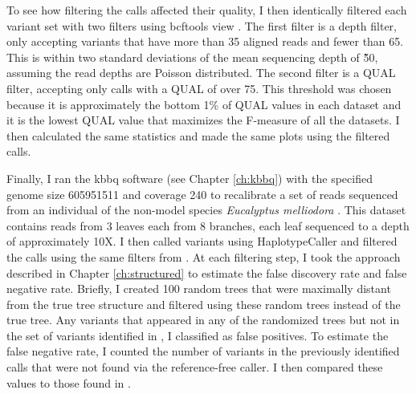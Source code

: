 To see how filtering the calls affected their quality, I then identically filtered each variant set with two filters using bcftools view \parencite{li_sequence_2009}. The first filter is a depth filter, only accepting variants that have more than 35 aligned reads and fewer than 65. This is within two standard deviations of the mean sequencing depth of \~50, assuming the read depths are Poisson distributed. The second filter is a QUAL filter, accepting only calls with a QUAL of over 75. This threshold was chosen because it is approximately the bottom 1\% of QUAL values in each dataset and it is the lowest QUAL value that maximizes the F-measure of all the datasets. I then calculated the same statistics and made the same plots using the filtered calls.


Finally, I ran the kbbq software (see Chapter \ref{ch:kbbq}) with the specified genome size 605951511 and coverage 240 to recalibrate a set of reads sequenced from an individual of the non-model species \textit{Eucalyptus melliodora} \parencite{orr_phylogenomic_2020}. This dataset contains reads from 3 leaves each from 8 branches, each leaf sequenced to a depth of approximately 10X. I then called variants using HaplotypeCaller and filtered the calls using the same filters from \cite{orr_phylogenomic_2020}. At each filtering step, I took the approach described in Chapter \ref{ch:structured} to estimate the false discovery rate and false negative rate. Briefly, I created 100 random trees that were maximally distant from the true tree structure and filtered using these random trees instead of the true tree. Any variants that appeared in any of the randomized trees but not in the set of variants identified in \cite{orr_phylogenomic_2020}, I classified as false positives. To estimate the false negative rate, I counted the number of variants in the previously identified calls that were not found via the reference-free caller. I then compared these values to those found in \cite{orr_phylogenomic_2020}.

